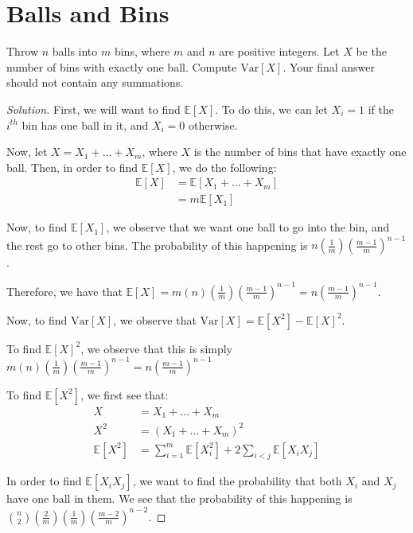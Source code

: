 \documentclass{article}
\newenvironment{solution}{\begin{proof}[Solution]}{\end{proof}}
\let\oldsum\sum
\renewcommand{\sum}[2]{\oldsum\limits_{#1}^{#2}}
\begin{document}
\section{Balls and Bins}
\begin{hw}
	Throw $n$ balls into $m$ bins, where $m$ and $n$ are positive integers. Let $X$ be the number of bins with exactly one ball. Compute $\mathrm{Var} [X]$. Your final answer should not contain any summations.
\end{hw}
\begin{solution}
	First, we will want to find $\mathbb{E}[X]$. To do this, we can let $X_{i} = 1$ if the $i^{th}$ bin has one ball in it, and $X_{i} = 0$ otherwise.
	
	Now, let $X = X_{1} + \ldots + X_{m}$, where $X$ is the number of bins that have exactly one ball. Then, in order to find $\mathbb{E}[X]$, we do the following:
	\begin{align*}
		\mathbb{E}[X] &= \mathbb{E}[X_{1} + \ldots + X_{m}] \\
		&= m\mathbb{E}[X_{1}]
	\end{align*}

	Now, to find $\mathbb{E}[X_{1}]$, we observe that we want one ball to go into the bin, and the rest go to other bins. The probability of this happening is $n \left( \frac{1}{m} \right)\left( \frac{m-1}{m} \right)^{n-1}$.
	
	Therefore, we have that $\mathbb{E}[X] = m(n)\left(\frac{1}{m} \right)\left( \frac{m-1}{m} \right)^{n-1} = n \left( \frac{m-1}{m} \right)^{n-1}$.
	
	Now, to find $\mathrm{Var}[X]$, we observe that $\mathrm{Var}[X] = \mathbb{E}[X^{2}] - \mathbb{E}[X]^{2}$.
	
	To find $\mathbb{E}[X]^{2}$, we observe that this is simply $m(n) \left( \frac{1}{m} \right)\left( \frac{m-1}{m} \right)^{n-1} = n \left( \frac{m-1}{m} \right)^{n-1}$
	
	To find $\mathbb{E}[X^{2}]$, we first see that:
	\begin{align*}
		X &= X_{1} + \ldots + X_{m} \\
		X^{2} &= (X_{1} + \ldots + X_{m})^{2} \\
		\mathbb{E}[X^{2}] &= \sum{i=1}{m}\mathbb{E}[X_{i}^{2}] + 2\sum{i<j}{}\mathbb{E}[X_{i}X_{j}]
	\end{align*}

	In order to find $\mathbb{E}[X_{i}X_{j}]$, we want to find the probability that both $X_{i}$ and $X_{j}$ have one ball in them. We see that the probability of this happening is $\binom{n}{2}(\frac{2}{m})(\frac{1}{m})\left( \frac{m-2}{m} \right)^{n-2}$.
	

\end{solution}
\end{document}

